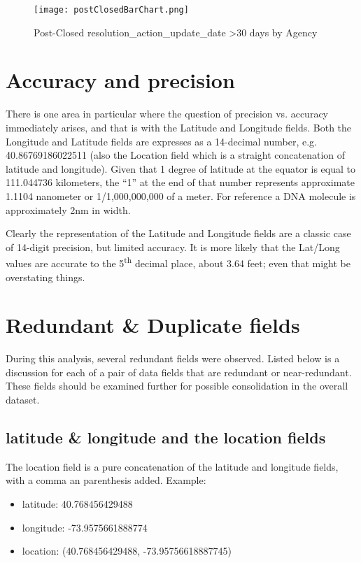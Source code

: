 \documentclass[12pt, titlepage]{article}
\begin{document}
{	\begin{figure}[H]
		 \centering
		 \texttt{[image: postClosedBarChart.png]}
		 \caption{Post-Closed resolution\_action\_update\_date >30 days by Agency }
		 \label{fig:resolution-by-agency}
	\end{figure}		

\section{Accuracy and precision}\label{sec:precision}
There is one area in particular where the question of precision vs. accuracy immediately arises, and that is with the Latitude and Longitude fields.  Both the 
Longitude and Latitude fields are expresses as a 14-decimal number, e.g. 40.86769186022511 (also the Location field which is a straight concatenation of
latitude and longitude). Given that 1 degree of latitude at the equator is equal to 111.044736 kilometers, the ``1'' at the end of that number represents
approximate 1.1104 nanometer or 1/1,000,000,000 of a meter. For reference a DNA molecule is approximately 2nm in width. 

Clearly the representation of the Latitude and Longitude fields are a classic case of 14-digit precision, 
but limited accuracy. It is more likely that the Lat/Long values are accurate to the 5\textsuperscript{th} decimal place, about 3.64 feet; even that might be
overstating things. 



\section{Redundant \& Duplicate fields}\label{sec:duplicates}
During this analysis, several redundant fields were observed. Listed below is a discussion for each of a pair
of data fields that are redundant or near-redundant. These fields should be examined further for possible
consolidation in the overall dataset.

\subsection{latitude \& longitude and the location fields}  The location field is a pure concatenation of the latitude and longitude fields, 
with a comma an parenthesis added. Example:  

	\begin{itemize}
		\item  latitude: 40.768456429488
		\item  longitude: -73.9575661888774
		\item  location: (40.768456429488, -73.95756618887745)
	\end{itemize}

}
\end{document}
